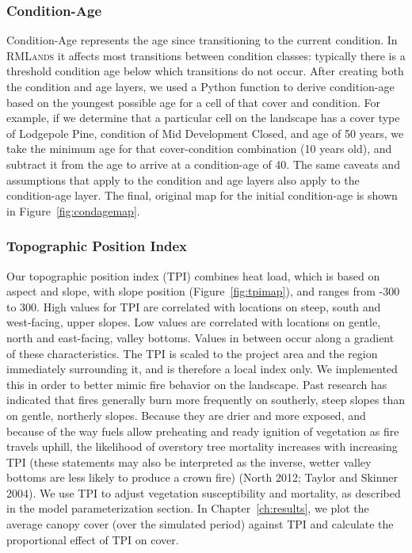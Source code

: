 \subsubsection{Condition-Age}
Condition-Age represents the age since transitioning to the current condition. In \textsc{RMLands} it affects most transitions between condition classes: typically there is a threshold condition age below which transitions do not occur. After creating both the condition and age layers, we used a Python function to derive condition-age based on the youngest possible age for a cell of that cover and condition. For example, if we determine that a particular cell on the landscape has a cover type of Lodgepole Pine, condition of Mid Development Closed, and age of 50 years, we take the minimum age for that cover-condition combination (10 years old), and subtract it from the age to arrive at a condition-age of 40. The same caveats and assumptions that apply to the condition and age layers also apply to the condition-age layer. The final, original map for the initial condition-age is shown in Figure~\ref{fig:condagemap}.


\subsubsection{Topographic Position Index}
Our topographic position index (TPI) combines heat load, which is based on aspect and slope, with slope position (Figure~\ref{fig:tpimap}), and ranges from -300 to 300. High values for TPI are correlated with locations on steep, south and west-facing, upper slopes. Low values are correlated with locations on gentle, north and east-facing, valley bottoms. Values in between occur along a gradient of these characteristics. The TPI is scaled to the project area and the region immediately surrounding it, and is therefore a local index only. We implemented this in order to better mimic fire behavior on the landscape. Past research has indicated that fires generally burn more frequently on southerly, steep slopes than on gentle, northerly slopes. Because they are drier and more exposed, and because of the way fuels allow preheating and ready ignition of vegetation as fire travels uphill, the likelihood of overstory tree mortality increases with increasing TPI (these statements may also be interpreted as the inverse, wetter valley bottoms are less likely to produce a crown fire) (North 2012; Taylor and Skinner 2004). We use TPI to adjust vegetation susceptibility and mortality, as described in the model parameterization section. In Chapter~\ref{ch:results}, we plot the average canopy cover (over the simulated period) against TPI and calculate the proportional effect of TPI on cover.



